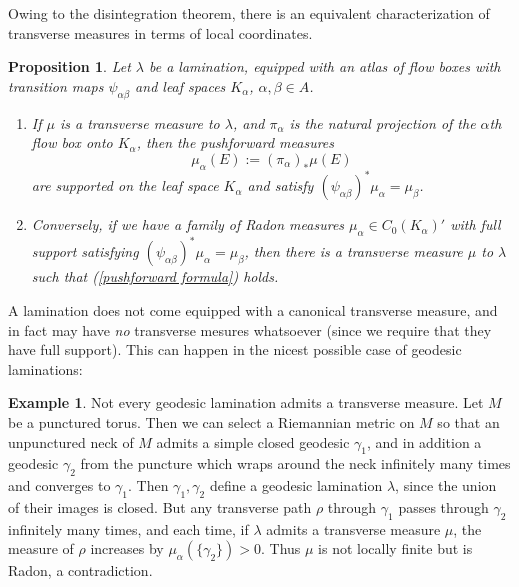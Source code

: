 \documentclass[reqno,10pt]{amsart}
\newtheorem{proposition}[theorem]{Proposition}
\theoremstyle{definition}
\newtheorem{example}[theorem]{Example}
\numberwithin{equation}{section}
\begin{document}
Owing to the disintegration theorem, there is an equivalent characterization of transverse measures in terms of local coordinates.

\begin{proposition}
Let $\lambda$ be a lamination, equipped with an atlas of flow boxes with transition maps $\psi_{\alpha\beta}$ and leaf spaces $K_\alpha$, $\alpha, \beta \in A$.
\begin{enumerate}
\item If $\mu$ is a transverse measure to $\lambda$, and $\pi_\alpha$ is the natural projection of the $\alpha$th flow box onto $K_\alpha$, then the pushforward measures
\begin{equation}\label{pushforward formula}
\mu_\alpha(E) := (\pi_\alpha)_* \mu(E)
\end{equation}
are supported on the leaf space $K_\alpha$ and satisfy $(\psi_{\alpha\beta})^* \mu_\alpha = \mu_\beta$.
\item Conversely, if we have a family of Radon measures $\mu_\alpha \in C_0(K_\alpha)'$ with full support satisfying $(\psi_{\alpha\beta})^* \mu_\alpha = \mu_\beta$, then there is a transverse measure $\mu$ to $\lambda$ such that (\ref{pushforward formula}) holds.
\end{enumerate}
\end{proposition}

A lamination does not come equipped with a canonical transverse measure, and in fact may have \emph{no} transverse mesures whatsoever (since we require that they have full support).
This can happen in the nicest possible case of geodesic laminations:

\begin{example}
Not every geodesic lamination admits a transverse measure.
Let $M$ be a punctured torus.
Then we can select a Riemannian metric on $M$ so that an unpunctured neck of $M$ admits a simple closed geodesic $\gamma_1$, and in addition a geodesic $\gamma_2$ from the puncture which wraps around the neck infinitely many times and converges to $\gamma_1$.
Then $\gamma_1, \gamma_2$ define a geodesic lamination $\lambda$, since the union of their images is closed.
But any transverse path $\rho$ through $\gamma_1$ passes through $\gamma_2$ infinitely many times, and each time, if $\lambda$ admits a transverse measure $\mu$, the measure of $\rho$ increases by $\mu_\alpha(\{\gamma_2\}) > 0$.
Thus $\mu$ is not locally finite but is Radon, a contradiction.
\end{example}

\end{document}
